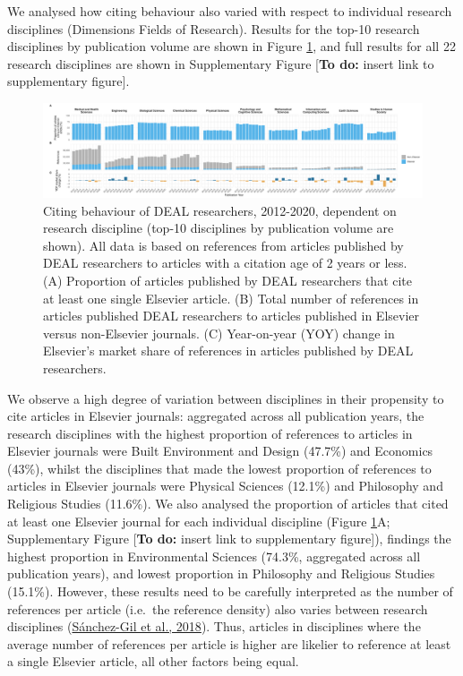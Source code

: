 \documentclass[
]{article}
\begin{document}
We analysed how citing behaviour also varied with respect to individual research disciplines (Dimensions Fields of Research). Results for the top-10 research disciplines by publication volume are shown in Figure \ref{fig:references-publisher-year-category}, and full results for all 22 research disciplines are shown in Supplementary Figure {[}\textbf{To do:} insert link to supplementary figure{]}.

\begin{figure}
\centering
\includegraphics{analysis_files/figure-latex/references-publisher-year-category-1.pdf}
\caption{\label{fig:references-publisher-year-category}Citing behaviour of DEAL researchers, 2012-2020, dependent on research discipline (top-10 disciplines by publication volume are shown). All data is based on references from articles published by DEAL researchers to articles with a citation age of 2 years or less. (A) Proportion of articles published by DEAL researchers that cite at least one single Elsevier article. (B) Total number of references in articles published DEAL researchers to articles published in Elsevier versus non-Elsevier journals. (C) Year-on-year (YOY) change in Elsevier's market share of references in articles published by DEAL researchers.}
\end{figure}

We observe a high degree of variation between disciplines in their propensity to cite articles in Elsevier journals: aggregated across all publication years, the research disciplines with the highest proportion of references to articles in Elsevier journals were Built Environment and Design (47.7\%) and Economics (43\%), whilst the disciplines that made the lowest proportion of references to articles in Elsevier journals were Physical Sciences (12.1\%) and Philosophy and Religious Studies (11.6\%). We also analysed the proportion of articles that cited at least one Elsevier journal for each individual discipline (Figure \ref{fig:references-publisher-year-category}A; Supplementary Figure {[}\textbf{To do:} insert link to supplementary figure{]}), findings the highest proportion in Environmental Sciences (74.3\%, aggregated across all publication years), and lowest proportion in Philosophy and Religious Studies (15.1\%). However, these results need to be carefully interpreted as the number of references per article (i.e.~the reference density) also varies between research disciplines (\href{https://doi.org/10.1016/j.joi.2017.11.003}{Sánchez-Gil et al., 2018}). Thus, articles in disciplines where the average number of references per article is higher are likelier to reference at least a single Elsevier article, all other factors being equal.
\end{document}
